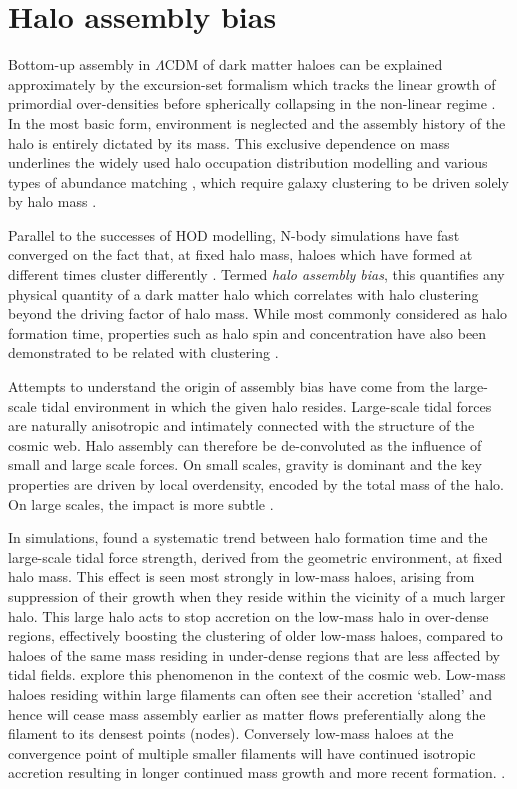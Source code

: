 \section{Halo assembly bias}
Bottom-up assembly in $\Lambda$CDM of dark matter haloes can be explained approximately by the excursion-set formalism which tracks the linear growth of primordial over-densities before spherically collapsing in the non-linear regime \citep{press1974,bond1991}. In the most basic form, environment is neglected and the assembly history of the halo is entirely dictated by its mass. This exclusive dependence on mass underlines the widely used halo occupation distribution \citep[HOD; e.g.][]{jing1998,peacock2000} modelling and various types of abundance matching \citep[e.g.][]{kravtsov2004,conroy2006}, which require galaxy clustering to be driven solely by halo mass \citep[e.g.][]{mo1996,sheth1999}. 

Parallel to the successes of HOD modelling, N-body simulations have fast converged on the fact that, at fixed halo mass, haloes which have formed at different times cluster differently \citep[e.g.][]{gao2005,wechsler2006,croton2007,wang2011}. Termed \textit{halo assembly bias}, this quantifies any physical quantity of a dark matter halo which correlates with halo clustering beyond the driving factor of halo mass. While most commonly considered as halo formation time, properties such as halo spin and concentration have also been demonstrated to be related with clustering \citep[e.g.][]{lacerna2012,lehmann2017}. 

Attempts to understand the origin of assembly bias have come from the large-scale tidal environment in which the given halo resides. Large-scale tidal forces are naturally anisotropic and intimately connected with the structure of the cosmic web. Halo assembly can therefore be de-convoluted as the influence of small and large scale forces. On small scales, gravity is dominant and the key properties are driven by local overdensity, encoded by the total mass of the halo. On large scales, the impact is more subtle .

In simulations, \citet{hahn2009} found a systematic trend between halo formation time and the large-scale tidal force strength, derived from the geometric environment, at fixed halo mass. This effect is seen most strongly in low-mass haloes, arising from suppression of their growth when they reside within the vicinity of a much larger halo. This large halo acts to stop accretion on the low-mass halo in over-dense regions, effectively boosting the clustering of older low-mass haloes, compared to haloes of the same mass residing in under-dense regions that are less affected by tidal fields. \citet{ZOMGI} explore this phenomenon in the context of the cosmic web. Low-mass haloes residing within large filaments can often see their accretion `stalled' and hence will cease mass assembly earlier as matter flows preferentially along the filament to its densest points (nodes). Conversely low-mass haloes at the convergence point of multiple smaller filaments will have continued isotropic accretion resulting in longer continued mass growth and more recent formation. \citep[See][for a theoretical approach]{musso2018}.

